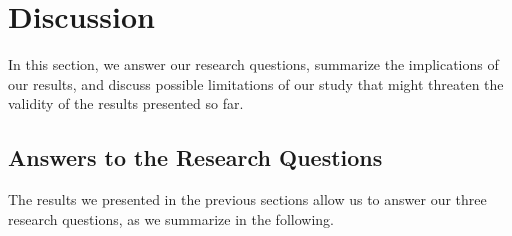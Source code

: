 \section{Discussion}\label{sec:discussion}

In this section, we answer our research questions,
summarize the implications of our results, and discuss possible
limitations of our study that might threaten the
validity of the results presented so far.

\subsection{Answers to the Research Questions}

The results we presented in the previous sections
allow us to answer our three research questions, as
we summarize in the following.

